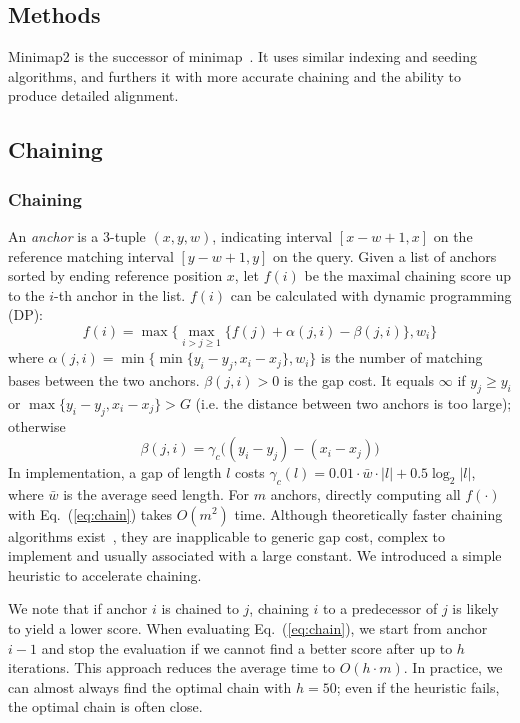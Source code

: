 \documentclass{bioinfo}
\begin{document}
\begin{methods}
\section{Methods}

Minimap2 is the successor of minimap~\citep{Li:2016aa}. It uses similar
indexing and seeding algorithms, and furthers it with more accurate chaining
and the ability to produce detailed alignment.

\subsection{Chaining}

\subsubsection{Chaining}
An \emph{anchor} is a 3-tuple $(x,y,w)$, indicating interval $[x-w+1,x]$ on the
reference matching interval $[y-w+1,y]$ on the query. Given a list of anchors
sorted by ending reference position $x$, let $f(i)$ be the maximal chaining
score up to the $i$-th anchor in the list. $f(i)$ can be calculated with
dynamic programming (DP):
\begin{equation}\label{eq:chain}
f(i)=\max\big\{\max_{i>j\ge 1} \{ f(j)+\alpha(j,i)-\beta(j,i) \},w_i\big\}
\end{equation}
where $\alpha(j,i)=\min\big\{\min\{y_i-y_j,x_i-x_j\},w_i\big\}$ is the number of
matching bases between the two anchors. $\beta(j,i)>0$ is the gap cost. It
equals $\infty$ if $y_j\ge y_i$ or $\max\{y_i-y_j,x_i-x_j\}>G$ (i.e. the
distance between two anchors is too large); otherwise
\begin{equation}\label{eq:chain-gap}
\beta(j,i)=\gamma_c\big((y_i-y_j)-(x_i-x_j)\big)
\end{equation}
In implementation, a gap of length $l$ costs $\gamma_c(l)=0.01\cdot \bar{w}\cdot
|l|+0.5\log_2|l|$, where $\bar{w}$ is the average seed length. For $m$ anchors, directly computing all $f(\cdot)$ with
Eq.~(\ref{eq:chain}) takes $O(m^2)$ time. Although theoretically faster
chaining algorithms exist~\citep{Abouelhoda:2005aa}, they
are inapplicable to generic gap cost, complex to implement and usually
associated with a large constant. We introduced a simple heuristic to
accelerate chaining.

We note that if anchor $i$ is chained to $j$, chaining $i$ to a predecessor
of $j$ is likely to yield a lower score. When evaluating Eq.~(\ref{eq:chain}),
we start from anchor $i-1$ and stop the evaluation if we cannot find a better
score after up to $h$ iterations. This approach reduces the average time to
$O(h\cdot m)$. In practice, we can almost always find the optimal chain with
$h=50$; even if the heuristic fails, the optimal chain is often close.


\end{methods}
\end{document}
